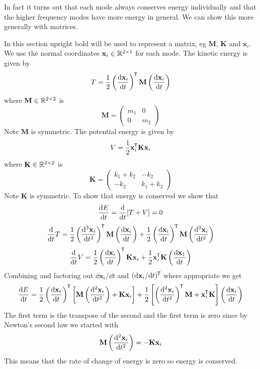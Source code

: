 \documentclass{article}
\newcommand{\mat}[1]{\mathbf{#1}}
\begin{document}
    In fact it turns out that each mode always conserves energy individually and that the higher frequency modes have more energy in general.
    We can show this more generally with matrices.
    
    In this section upright bold will be used to represent a matrix, eg \(\mat M\), \(\mat K\) and \(\mat x_i\).
    We use the normal coordinates \(\mat x_i\in\bb R^{2\times1}\) for each mode.
    The kinetic energy is given by
    \[T = \frac{1}{2}\left(\dv{\mat x_i}{t}\right)\trans\mat M \left(\dv{\mat x_i}{t}\right)\]
    where \(\mat M\in\bb R^{2\times2}\) is
    \[\mat M = \begin{pmatrix}
        m_1 & 0\\
        0 & m_2
    \end{pmatrix}\]
    Note \(\mat M\) is symmetric.
    The potential energy is given by
    \[V = \frac{1}{2}\mat x_i\trans\mat K\mat x_i\]
    where \(\mat K\in\bb R^{2\times2}\) is
    \[\mat K = \begin{pmatrix}
        k_1 + k_2 & -k_2\\
        -k_2 & k_1 + k_2
    \end{pmatrix}\]
    Note \(\mat K\) is symmetric.
    To show that energy is conserved we show that
    \[\dv{E}{t} = \dv{t}[T + V] = 0\]
    \[\dv{t}T = \frac{1}{2}\left(\dv[2]{\mat x_i}{t}\right)\trans\mat M\left(\dv{\mat x_i}{t}\right) + \frac{1}{2}\left(\dv{\mat x_i}{t}\right)\trans\mat M\left(\dv[2]{\mat x_i}{t}\right)\]
    \[\dv{t}V = \frac{1}{2}\left(\dv{\mat x_i}{t}\right)\trans\mat K\mat x_i + \frac{1}{2}\mat x_i\trans\mat K\left(\dv{\mat x_1}{t}\right)\]
    Combining and factoring out \(\dd\mat x_i/\dd t\) and \((\dd\mat x_i/\dd t)\trans\) where appropriate we get
    \[\dv{E}{t} = \frac{1}{2}\left(\dv{\mat x_i}{t}\right)\trans\left[\mat M\left(\dv[2]{\mat x_i}{t}\right) + \mat K\mat x_i\right] + \frac{1}{2}\left[\left(\dv[2]{\mat x_i}{t}\right)\trans\mat M + \mat x_i\trans\mat K\right]\left(\dv{\mat x_i}{t}\right)\]
    The first term is the transpose of the second and the first term is zero since by Newton's second law we started with
    \[\mat M\left(\dv[2]{\mat x_i}{t}\right) = -\mat K\mat x_i\]
    This means that the rate of change of energy is zero so energy is conserved.
    
\end{document}

